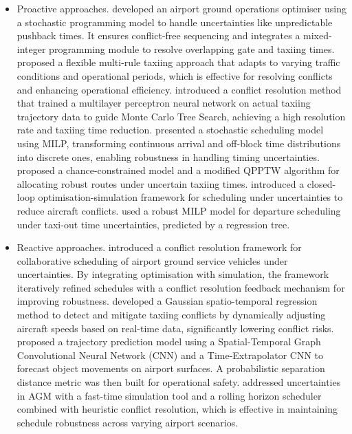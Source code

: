 \documentclass{article}
\begin{document}
\begin{itemize}
\item Proactive approaches. \cite{donmez2024airport} developed an airport ground operations optimiser using a stochastic programming model to handle uncertainties like unpredictable pushback times. It ensures conflict-free sequencing and integrates a mixed-integer programming module to resolve overlapping gate and taxiing times. \cite{liu2024adaptive} proposed a flexible multi-rule taxiing approach that adapts to varying traffic conditions and operational periods, which is effective for resolving conflicts and enhancing operational efficiency. \cite{sui2023conflict} introduced a conflict resolution method that trained a multilayer perceptron neural network on actual taxiing trajectory data to guide Monte Carlo Tree Search, achieving a high resolution rate and taxiing time reduction. \cite{yang2022stochastic} presented a stochastic scheduling model using MILP, transforming continuous arrival and off-block time distributions into discrete ones, enabling robustness in handling timing uncertainties. \cite{wang2021chance} proposed a chance-constrained model and a modified QPPTW algorithm for allocating robust routes under uncertain taxiing times. \cite{scala2021optimization} introduced a closed-loop optimisation-simulation framework for scheduling under uncertainties to reduce aircraft conflicts. \cite{murcca2017robust} used a robust MILP model for departure scheduling under taxi-out time uncertainties, predicted by a regression tree.
\item Reactive approaches. \cite{liu2024reliable} introduced a conflict resolution framework for collaborative scheduling of airport ground service vehicles under uncertainties. By integrating optimisation with simulation, the framework iteratively refined schedules with a conflict resolution feedback mechanism for improving robustness. \cite{lian2023aircraft} developed a Gaussian spatio-temporal regression method to detect and mitigate taxiing conflicts by dynamically adjusting aircraft speeds based on real-time data, significantly lowering conflict risks. \cite{zhang2022airport} proposed a trajectory prediction model using a Spatial-Temporal Graph Convolutional Neural Network (CNN) and a Time-Extrapolator CNN to forecast object movements on airport surfaces. A probabilistic separation distance metric was then built for operational safety. \cite{yang2022stochastic} addressed uncertainties in AGM with a fast-time simulation tool and a rolling horizon scheduler combined with heuristic conflict resolution, which is effective in maintaining schedule robustness across varying airport scenarios.
\end{itemize}
\end{document}
